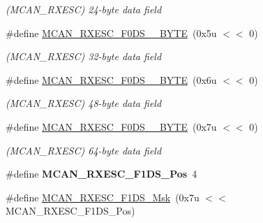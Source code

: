 \begin{DoxyCompactItemize}
\begin{DoxyCompactList}\small\item\em (M\+C\+A\+N\+\_\+\+R\+X\+E\+SC) 24-\/byte data field \end{DoxyCompactList}\item 
\mbox{\label{group__SAMV71__MCAN_ga2335c3bf50adc6329bb65252d8e50148}} 
\#define \mbox{\hyperlink{group__SAMV71__MCAN_ga2335c3bf50adc6329bb65252d8e50148}{M\+C\+A\+N\+\_\+\+R\+X\+E\+S\+C\+\_\+\+F0\+D\+S\+\_\+\_\+\+B\+Y\+TE}}~(0x5u $<$$<$ 0)
\begin{DoxyCompactList}\small\item\em (M\+C\+A\+N\+\_\+\+R\+X\+E\+SC) 32-\/byte data field \end{DoxyCompactList}\item 
\mbox{\label{group__SAMV71__MCAN_ga67b66ce86491502013e887aaebe0b01b}} 
\#define \mbox{\hyperlink{group__SAMV71__MCAN_ga67b66ce86491502013e887aaebe0b01b}{M\+C\+A\+N\+\_\+\+R\+X\+E\+S\+C\+\_\+\+F0\+D\+S\+\_\+\_\+\+B\+Y\+TE}}~(0x6u $<$$<$ 0)
\begin{DoxyCompactList}\small\item\em (M\+C\+A\+N\+\_\+\+R\+X\+E\+SC) 48-\/byte data field \end{DoxyCompactList}\item 
\mbox{\label{group__SAMV71__MCAN_gabcceebf944bc9ab4176bec5f304076a7}} 
\#define \mbox{\hyperlink{group__SAMV71__MCAN_gabcceebf944bc9ab4176bec5f304076a7}{M\+C\+A\+N\+\_\+\+R\+X\+E\+S\+C\+\_\+\+F0\+D\+S\+\_\+\_\+\+B\+Y\+TE}}~(0x7u $<$$<$ 0)
\begin{DoxyCompactList}\small\item\em (M\+C\+A\+N\+\_\+\+R\+X\+E\+SC) 64-\/byte data field \end{DoxyCompactList}\item 
\mbox{\label{group__SAMV71__MCAN_ga9ca06dbf1f0ad95e328af7e64f65f7d4}} 
\#define {\bfseries M\+C\+A\+N\+\_\+\+R\+X\+E\+S\+C\+\_\+\+F1\+D\+S\+\_\+\+Pos}~4
\item 
\mbox{\label{group__SAMV71__MCAN_ga73140fa88a89dccc958dfcb691290313}} 
\#define \mbox{\hyperlink{group__SAMV71__MCAN_ga73140fa88a89dccc958dfcb691290313}{M\+C\+A\+N\+\_\+\+R\+X\+E\+S\+C\+\_\+\+F1\+D\+S\+\_\+\+Msk}}~(0x7u $<$$<$ M\+C\+A\+N\+\_\+\+R\+X\+E\+S\+C\+\_\+\+F1\+D\+S\+\_\+\+Pos)

\end{DoxyCompactItemize}
